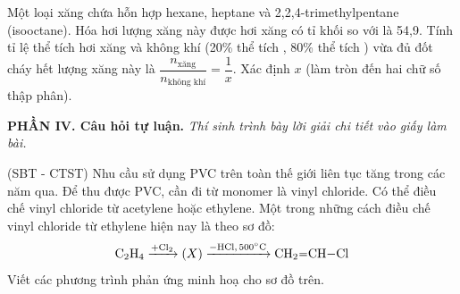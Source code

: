 \documentclass[12pt,a4paper]{article}
\begin{document}
\begin{ex}
Một loại xăng chứa hỗn hợp hexane, heptane và 2,2,4-trimethylpentane (isooctane). Hóa hơi lượng xăng này được hơi xăng có tỉ khối so với  là 54,9. Tính tỉ lệ thể tích hơi xăng và không khí (20\% thể tích , 80\% thể tích ) vừa đủ đốt cháy hết lượng xăng này là $\dfrac{n_{\text{xăng}}}{n_{\text{không khí}}} = \dfrac{1}{x}$. Xác định $x$ (làm tròn đến hai chữ số thập phân).
\end{ex}

\bigskip
\noindent\textbf{\large PHẦN IV. Câu hỏi tự luận.}
\textit{Thí sinh trình bày lời giải chi tiết vào giấy làm bài.}
\vspace{0.2cm}

\begin{ex}
(SBT - CTST) Nhu cầu sử dụng PVC trên toàn thế giới liên tục tăng trong các năm qua. Để thu được PVC, cần đi từ monomer là vinyl chloride. Có thể điều chế vinyl chloride từ acetylene hoặc ethylene. Một trong những cách điều chế vinyl chloride từ ethylene hiện nay là theo sơ đồ:
\[
\ce{C2H4} \xrightarrow{+\ce{Cl2}} (X) \xrightarrow{-\ce{HCl},\, 500^\circ\text{C}} \ce{CH2=CH-Cl}
\]
Viết các phương trình phản ứng minh hoạ cho sơ đồ trên.


\end{ex}
\end{document}
